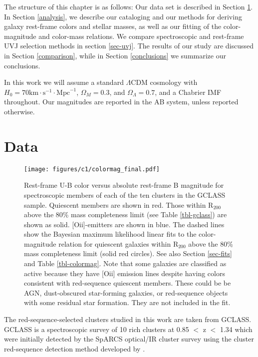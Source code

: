 The structure of this chapter is as follows:
Our data set is described in Section \ref{data}.
In Section \ref{analysis}, we describe our cataloging and our methods for deriving galaxy rest-frame colors and stellar masses, as well as our fitting of the color-magnitude and color-mass relations. We compare spectroscopic and rest-frame UVJ selection methods in section \ref{sec-uvj}.
The results of our study are discussed in Section \ref{comparison}, while in Section \ref{conclusions} we summarize our conclusions.

In this work we will assume a standard $\Lambda$CDM cosmology with $H_0 = 70 \mathrm{km} \cdot \mathrm{s}^{-1} \cdot \mathrm{Mpc}^{-1}$, $\Omega_M = 0.3$, and $\Omega_\Lambda = 0.7$, and a Chabrier IMF \citep{chabrierimf} throughout.
Our magnitudes are reported in the AB system, unless reported otherwise.

\section{Data}\label{data}
\begin{figure*}
\centering \texttt{[image: figures/c1/colormag\_final.pdf]}
\caption[Color-magnitude diagram for the GCLASS cluster sample]{Rest-frame U-B color versus absolute rest-frame B magnitude for spectroscopic members of each of the ten clusters in the GCLASS sample.
Quiescent members are shown in red. Those within R$_{200}$ above the 80\% mass completeness limit (see Table \ref{tbl-gclass}) are shown as solid. [O{\sc ii}]-emitters are shown in blue. The dashed lines show the Bayesian maximum likelihood linear fits to the color-magnitude relation for quiescent galaxies within R$_{200}$ above the 80\% mass completeness limit (solid red circles). See also Section \ref{sec-fits} and Table \ref{tbl-colormag}.
Note that some galaxies are classified as active because they have [O{\sc ii}] emission lines despite having colors consistent with red-sequence quiescent members. These could be be AGN, dust-obscured star-forming galaxies, or red-sequence objects with some residual star formation. They are not included in the fit.\label{fig-colormag}}
\end{figure*}

The red-sequence-selected clusters studied in this work are taken from GCLASS. GCLASS is a spectroscopic survey of 10 rich clusters at 0.85 $<$ z $<$ 1.34 which were initially detected by the SpARCS optical/IR cluster survey using the cluster red-sequence detection method developed by \cite{Gladders:2000rq} \citep[see][]{Muzzin:2009jm,Wilson:2009ws,Demarco:2010om}.

